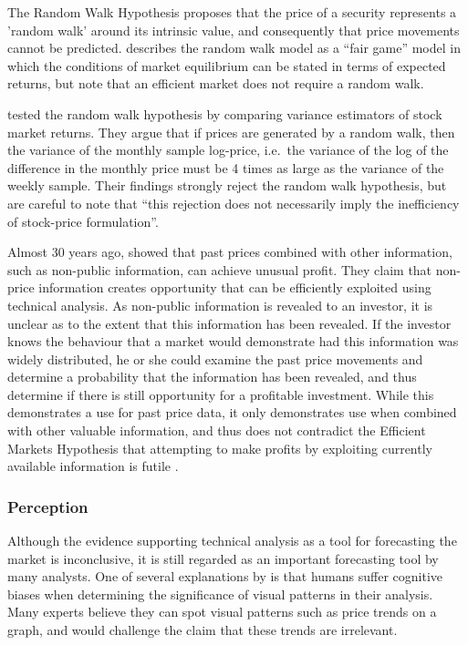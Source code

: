 \documentclass[12pt, oneside, a4paper]{article}
\theoremstyle{definition}
\begin{document}
The Random Walk Hypothesis proposes that the price of a security represents a 'random walk' around its intrinsic value, and consequently that price movements cannot be predicted. \cite{malkiel1970efficient} describes the random walk model as a ``fair game'' model in which the conditions of market equilibrium can be stated in terms of expected returns, but note that an efficient market does not require a random walk. 

\cite{lo1988} tested the random walk hypothesis by comparing variance estimators of stock market returns. They argue that if prices are generated by a random walk, then the variance of the monthly sample log-price, i.e.\ the variance of the log of the difference in the monthly price must be 4 times as large as the variance of the weekly sample. Their findings strongly reject the random walk hypothesis, but are careful to note that ``this rejection does not necessarily imply the inefficiency of stock-price formulation''.

Almost 30 years ago, \cite{indefenseof} showed that past prices combined with other information, such as non-public information, can achieve unusual profit. They claim that non-price information creates opportunity that can be efficiently exploited using technical analysis. As non-public information is revealed to an investor, it is unclear as to the extent that this information has been revealed. If the investor knows the behaviour that a market would demonstrate had this information was widely distributed, he or she could examine the past price movements and determine a probability that the information has been revealed, and thus determine if there is still opportunity for a profitable investment. While this demonstrates a use for past price data, it only demonstrates use when combined with other valuable information, and thus does not contradict the Efficient Markets Hypothesis that attempting to make profits by exploiting currently available information is futile \citep{taprofitability}.

\subsubsection{Perception}

\label{tahumanz}

Although the evidence supporting technical analysis as a tool for forecasting the market is inconclusive, it is still regarded as an important forecasting tool by many analysts. One of several explanations by \cite[pp.~45-71]{aronson2011evidence} is that humans suffer cognitive biases when determining the significance of visual patterns in their analysis. Many experts believe they can spot visual patterns such as price trends on a graph, and would challenge the claim that these trends are irrelevant.
\end{document}
